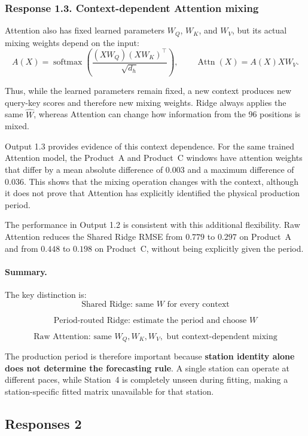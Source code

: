 \documentclass[a4, 12pt]{article}
\begin{document}
\subsubsection{Response 1.3. Context-dependent Attention mixing}
Attention also has fixed learned parameters $W_Q$, $W_K$, and $W_V$, but
its actual mixing weights depend on the input:
\begin{equation}
A(X)=
\operatorname{softmax}
\left(
\frac{(XW_Q)(XW_K)^{\top}}{\sqrt{d_h}}
\right),
\qquad
\operatorname{Attn}(X)=A(X)XW_V .
\end{equation}

Thus, while the learned parameters remain fixed, a new context produces
new query-key scores and therefore new mixing weights. Ridge always applies
the same $\hat{W}$, whereas Attention can change how information from the
96 positions is mixed.

Output 1.3 provides evidence of this context dependence. For the same
trained Attention model, the Product~A and Product~C windows have attention
weights that differ by a mean absolute difference of $0.003$ and a maximum
difference of $0.036$. This shows that the mixing operation changes with
the context, although it does not prove that Attention has explicitly
identified the physical production period.

The performance in Output 1.2 is consistent with this additional
flexibility. Raw Attention reduces the Shared Ridge RMSE from $0.779$ to
$0.297$ on Product~A and from $0.448$ to $0.198$ on Product~C, without
being explicitly given the period.

\paragraph{Summary.}
The key distinction is:
\[
\boxed{
\text{Shared Ridge: same }W\text{ for every context}
}
\]

\[
\boxed{
\text{Period-routed Ridge: estimate the period and choose }W
}
\]

\[
\boxed{
\text{Raw Attention: same }W_Q,W_K,W_V,\text{ but context-dependent mixing}
}
\]

The production period is therefore important because \textbf{station
identity alone does not determine the forecasting rule}. A single station
can operate at different paces, while Station~4 is completely unseen
during fitting, making a station-specific fitted matrix unavailable for
that station.


\subsection{Responses 2}
\end{document}
